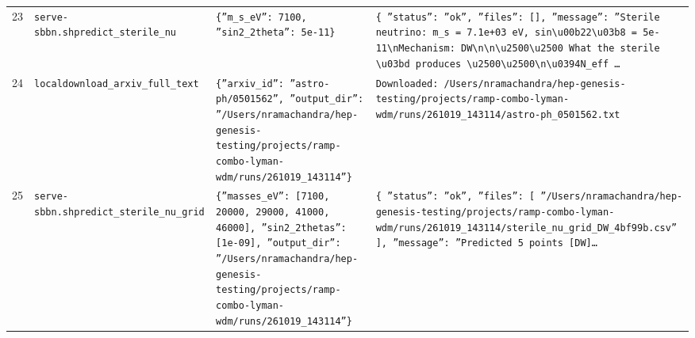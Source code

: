 \documentclass[11pt,a4paper]{article}
\begin{document}
\begin{longtable}{@{}p{}p{}p{}p{}@{}}
23 & \texttt{serve-sbbn.sh}\newline\texttt{predict\_\allowbreak{}sterile\_\allowbreak{}nu} & \texttt{\{''m\_\allowbreak{}s\_\allowbreak{}eV'':\allowbreak{} 7100,\allowbreak{} ''sin2\_\allowbreak{}2theta'':\allowbreak{} 5e-11\}\allowbreak{}} & \texttt{\{   ''status'':\allowbreak{} ''ok'',\allowbreak{}   ''files'':\allowbreak{} []\allowbreak{},\allowbreak{}   ''message'':\allowbreak{} ''Sterile neutrino:\allowbreak{} m\_\allowbreak{}s =\allowbreak{} 7.1e+03 eV,\allowbreak{} sin\textbackslash{}\allowbreak{}u00b22\textbackslash{}\allowbreak{}u03b8 =\allowbreak{} 5e-11\textbackslash{}\allowbreak{}nMechanism:\allowbreak{} DW\textbackslash{}\allowbreak{}n\textbackslash{}\allowbreak{}n\textbackslash{}\allowbreak{}u2500\textbackslash{}\allowbreak{}u2500 What the sterile \textbackslash{}\allowbreak{}u03bd produces \textbackslash{}\allowbreak{}u2500\textbackslash{}\allowbreak{}u2500\textbackslash{}\allowbreak{}n\textbackslash{}\allowbreak{}u0394N\_\allowbreak{}eff \ldots{}\allowbreak{}} \\
24 & \texttt{local}\newline\texttt{download\_\allowbreak{}arxiv\_\allowbreak{}full\_\allowbreak{}text} & \texttt{\{''arxiv\_\allowbreak{}id'':\allowbreak{} ''astro-ph/\allowbreak{}0501562'',\allowbreak{} ''output\_\allowbreak{}dir'':\allowbreak{} ''/\allowbreak{}Users/\allowbreak{}nramachandra/\allowbreak{}hep-genesis-testing/\allowbreak{}projects/\allowbreak{}ramp-combo-lyman-wdm/\allowbreak{}runs/\allowbreak{}261019\_\allowbreak{}143114''\}\allowbreak{}} & \texttt{Downloaded:\allowbreak{} /\allowbreak{}Users/\allowbreak{}nramachandra/\allowbreak{}hep-genesis-testing/\allowbreak{}projects/\allowbreak{}ramp-combo-lyman-wdm/\allowbreak{}runs/\allowbreak{}261019\_\allowbreak{}143114/\allowbreak{}astro-ph\_\allowbreak{}0501562.txt} \\
25 & \texttt{serve-sbbn.sh}\newline\texttt{predict\_\allowbreak{}sterile\_\allowbreak{}nu\_\allowbreak{}grid} & \texttt{\{''masses\_\allowbreak{}eV'':\allowbreak{} [7100,\allowbreak{} 20000,\allowbreak{} 29000,\allowbreak{} 41000,\allowbreak{} 46000]\allowbreak{},\allowbreak{} ''sin2\_\allowbreak{}2thetas'':\allowbreak{} [1e-09]\allowbreak{},\allowbreak{} ''output\_\allowbreak{}dir'':\allowbreak{} ''/\allowbreak{}Users/\allowbreak{}nramachandra/\allowbreak{}hep-genesis-testing/\allowbreak{}projects/\allowbreak{}ramp-combo-lyman-wdm/\allowbreak{}runs/\allowbreak{}261019\_\allowbreak{}143114''\}\allowbreak{}} & \texttt{\{   ''status'':\allowbreak{} ''ok'',\allowbreak{}   ''files'':\allowbreak{} [     ''/\allowbreak{}Users/\allowbreak{}nramachandra/\allowbreak{}hep-genesis-testing/\allowbreak{}projects/\allowbreak{}ramp-combo-lyman-wdm/\allowbreak{}runs/\allowbreak{}261019\_\allowbreak{}143114/\allowbreak{}sterile\_\allowbreak{}nu\_\allowbreak{}grid\_\allowbreak{}DW\_\allowbreak{}4bf99b.csv''   ]\allowbreak{},\allowbreak{}   ''message'':\allowbreak{} ''Predicted 5 points [DW]\allowbreak{}\ldots{}\allowbreak{}} \\

\end{longtable}
\end{document}
